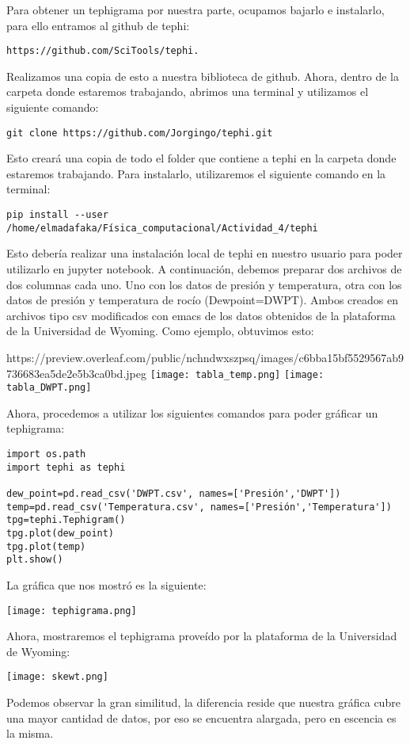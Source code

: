 \documentclass{article}
\begin{document}
Para obtener un tephigrama por nuestra parte, ocupamos bajarlo e instalarlo, para ello entramos al github de tephi: 
\begin{verbatim}
https://github.com/SciTools/tephi.
\end{verbatim}
Realizamos una copia de esto a nuestra biblioteca de github. Ahora, dentro de la carpeta donde estaremos trabajando, abrimos una terminal y utilizamos el siguiente comando:
\begin{verbatim}
git clone https://github.com/Jorgingo/tephi.git
\end{verbatim}
Esto creará una copia de todo el folder que contiene a tephi en la carpeta donde estaremos trabajando. Para instalarlo, utilizaremos el siguiente comando en la terminal:
\begin{verbatim}
pip install --user /home/elmadafaka/Física_computacional/Actividad_4/tephi
\end{verbatim}
Esto debería realizar una instalación local de tephi en nuestro usuario para poder utilizarlo en jupyter notebook.
\newpage
A continuación, debemos preparar dos archivos de dos columnas cada uno. Uno con los datos de presión y temperatura, otra con los datos de presión y temperatura de rocío (Dewpoint=DWPT).
Ambos creados en archivos tipo csv modificados con emacs de los datos obtenidos de la plataforma de la Universidad de Wyoming. Como ejemplo, obtuvimos esto:\\
\begin{center}https://preview.overleaf.com/public/nchndwxszpsq/images/c6bba15bf5529567ab9736683ea5de2e5b3ca0bd.jpeg
\texttt{[image: tabla\_temp.png]}
\texttt{[image: tabla\_DWPT.png]}
\end{center}
Ahora, procedemos a utilizar los siguientes comandos para poder gráficar un tephigrama:
\begin{verbatim}
import os.path
import tephi as tephi

dew_point=pd.read_csv('DWPT.csv', names=['Presión','DWPT'])
temp=pd.read_csv('Temperatura.csv', names=['Presión','Temperatura'])
tpg=tephi.Tephigram()
tpg.plot(dew_point)
tpg.plot(temp)
plt.show()
\end{verbatim}
\newpage
La gráfica que nos mostró es la siguiente:\\
\begin{center}
\texttt{[image: tephigrama.png]}
\end{center}
Ahora, mostraremos el tephigrama proveído por la plataforma de la Universidad de Wyoming:\\
\begin{center}
\texttt{[image: skewt.png]}
\end{center}
Podemos observar la gran similitud, la diferencia reside que nuestra gráfica cubre una mayor cantidad de datos, por eso se encuentra alargada, pero en escencia es la misma.
\newpage
\end{document}
